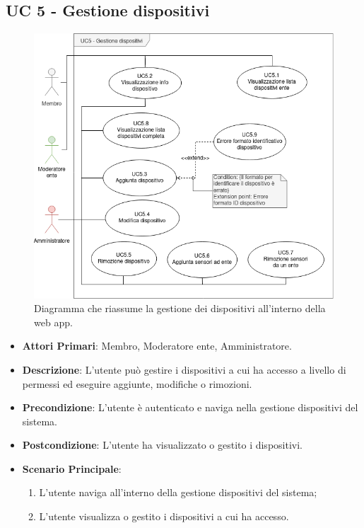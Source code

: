	\subsection{UC 5 - Gestione dispositivi}
		
		\begin{figure}[H]
			\centering
			\includegraphics[scale=0.60]{res/images/uc5}
			\caption{Diagramma che riassume la gestione dei dispositivi all'interno della web app.}
		\end{figure}
		
		\begin{itemize}
			\item \textbf{Attori Primari}: Membro, Moderatore ente, Amministratore.
			\item \textbf{Descrizione}: L'utente può gestire i dispositivi a cui ha accesso a livello di permessi ed eseguire aggiunte, modifiche o rimozioni.
			\item \textbf{Precondizione}: L'utente è autenticato e naviga nella gestione dispositivi del sistema.
			\item \textbf{Postcondizione}: L'utente ha visualizzato o gestito i dispositivi.
			\item \textbf{Scenario Principale}:
			\begin{enumerate}
				\item{L'utente naviga all'interno della gestione dispositivi del sistema;}
				\item{L'utente visualizza o gestito i dispositivi a cui ha accesso.}
			\end{enumerate}
		\end{itemize}
			
